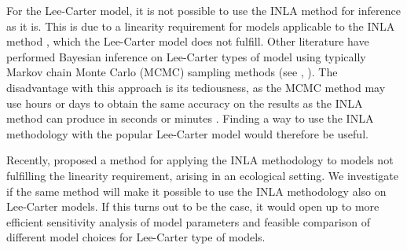 \newpar For the Lee-Carter model, it is not possible to use the INLA method for inference as it is. This is due to a linearity requirement for models applicable to the INLA method \parencite{martinoRiebler2019}, which the Lee-Carter model does not fulfill. Other literature have performed Bayesian inference on Lee-Carter types of model using typically Markov chain Monte Carlo (MCMC) sampling methods (see \textcite{CZADO2005260}, \textcite{Wisniowski2015}). The disadvantage with this approach is its tediousness, as the MCMC method may use hours or days to obtain the same accuracy on the results as the INLA method can produce in seconds or minutes \parencite{rue2009inla}. Finding a way to use the INLA methodology with the popular Lee-Carter model would therefore be useful. 

\newpar Recently, \textcite{BachlLindgren2019} proposed a method for applying the INLA methodology to models not fulfilling the linearity requirement, arising in an ecological setting. We investigate if the same method will make it possible to use the INLA methodology also on Lee-Carter models. If this turns out to be the case, it would open up to more efficient sensitivity analysis of model parameters and feasible comparison of different model choices for Lee-Carter type of models.

